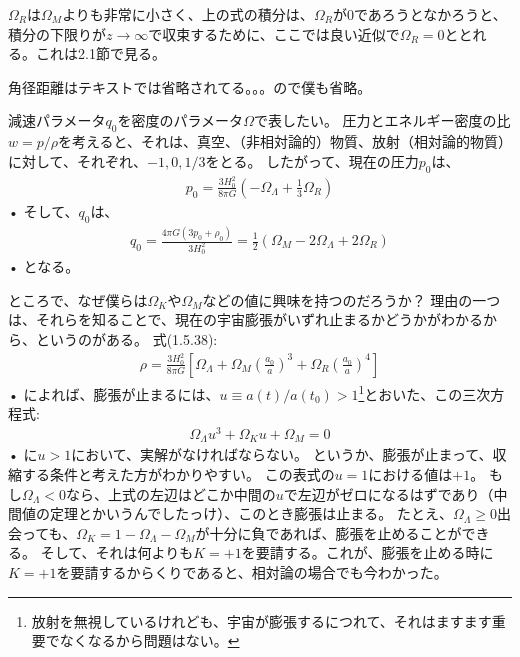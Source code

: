 \documentclass[11pt,a4paper,dvipdfmx]{jsarticle}
\theoremstyle{plain}
\theoremstyle{break}
\begin{document}
$\Omega_{R}$は$\Omega_{M}$よりも非常に小さく、上の式の積分は、$\Omega_{R}$が$0$であろうとなかろうと、積分の下限りが$z \to \infty$で収束するために、ここでは良い近似で$\Omega_{R} = 0$ととれる。これは2.1節で見る。

角径距離はテキストでは省略されてる。。。ので僕も省略。

減速パラメータ$q_0$を密度のパラメータ$\Omega$で表したい。
圧力とエネルギー密度の比$w = p/\rho$を考えると、それは、真空、（非相対論的）物質、放射（相対論的物質）に対して、それぞれ、$-1,0,1/3$をとる。
したがって、現在の圧力$p_0$は、
\begin{align}
  p_{0}=\frac{3 H_{0}^{2}}{8 \pi G}\left(-\Omega_{\Lambda}+\frac{1}{3} \Omega_{R}\right)
\end{align}•%
そして、$q_0$は、
\begin{align}
  q_{0}=\frac{4 \pi G\left(3 p_{0}+\rho_{0}\right)}{3 H_{0}^{2}}=\frac{1}{2}\left(\Omega_{M}-2 \Omega_{\Lambda}+2 \Omega_{R}\right)
\end{align}•%
となる。

ところで、なぜ僕らは$\Omega_{K}$や$\Omega_{M}$などの値に興味を持つのだろうか？
理由の一つは、それらを知ることで、現在の宇宙膨張がいずれ止まるかどうかがわかるから、というのがある。
式(1.5.38):
\begin{align}
  \rho=\frac{3 H_{0}^{2}}{8 \pi G}\left[\Omega_{\Lambda}+\Omega_{M}\left(\frac{a_{0}}{a}\right)^{3}+\Omega_{R}\left(\frac{a_{0}}{a}\right)^{4}\right]
\end{align}•%
によれば、膨張が止まるには、$u \equiv a(t) / a\left(t_{0}\right) >1 $\footnote{放射を無視しているけれども、宇宙が膨張するにつれて、それはますます重要でなくなるから問題はない。}とおいた、この三次方程式:
\begin{align}
  \Omega_{\Lambda} u^{3}+\Omega_{K} u+\Omega_{M}=0
\end{align}•%
に$u>1$において、実解がなければならない。
というか、膨張が止まって、収縮する条件と考えた方がわかりやすい。
この表式の$u=1$における値は$+1$。
もし$\Omega_{\Lambda} < 0$なら、上式の左辺はどこか中間の$u$で左辺がゼロになるはずであり（中間値の定理とかいうんでしたっけ）、このとき膨張は止まる。
たとえ、$\Omega_{\Lambda} \geq 0$出会っても、$\Omega_{K}  = 1 - \Omega_{\Lambda} - \Omega_{M}$が十分に負であれば、膨張を止めることができる。
そして、それは何よりも$K=+1$を要請する。これが、膨張を止める時に$K=+1$を要請するからくりであると、相対論の場合でも今わかった。
\end{document}
